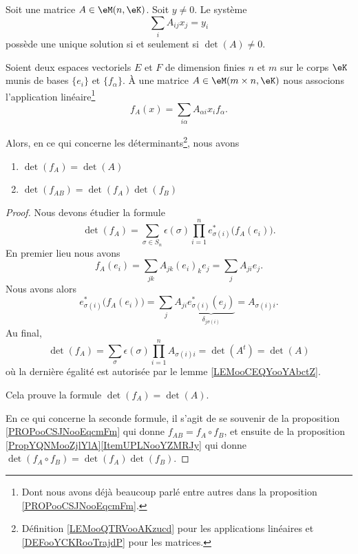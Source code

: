 \begin{proposition}	\label{PROPooNRZEooPxEqnO}
	Soit une matrice \( A\in \eM(n,\eK)\). Soit \( y\neq 0\). Le système
	\begin{equation}
		\sum_iA_{ij}x_j=y_i
	\end{equation}
	possède une unique solution si et seulement si \( \det(A)\neq 0\).
\end{proposition}


\begin{proposition}     \label{PROPooFKDXooKMSolt}
	Soient deux espaces vectoriels \( E\) et \( F\) de dimension finies \( n\) et \( m\) sur le corps \( \eK\) munis de bases \( \{e_i\}\) et \( \{f_{\alpha}\}\). À une matrice \( A\in \eM(m\times n,\eK)\) nous associons l'application linéaire\footnote{Dont nous avons déjà beaucoup parlé entre autres dans la proposition \ref{PROPooCSJNooEqcmFm}.}
	\begin{equation}
		f_A(x)=\sum_{i\alpha}A_{\alpha i}x_if_{\alpha}.
	\end{equation}

	Alors, en ce qui concerne les déterminants\footnote{Définition \ref{LEMooQTRVooAKzucd} pour les applications linéaires et \ref{DEFooYCKRooTrajdP} pour les matrices.}, nous avons
	\begin{enumerate}
		\item
		      \( \det(f_A)=\det(A)\)
		\item
		      \( \det(f_{AB})=\det(f_A)\det(f_B)\)
	\end{enumerate}
\end{proposition}

\begin{proof}
	Nous devons étudier la formule
	\begin{equation}
		\det(f_A)=\sum_{\sigma\in S_n}\epsilon(\sigma)\prod_{i=1}^ne_{\sigma(i)}^*\big( f_A(e_i) \big).
	\end{equation}
	En premier lieu nous avons
	\begin{equation}
		f_A(e_i)=\sum_{jk}A_{jk}(e_i)_ke_j=\sum_jA_{ji}e_j.
	\end{equation}
	Nous avons alors
	\begin{equation}
		e_{\sigma(i)}^*\big( f_A(e_i) \big)=\sum_jA_{ji}\underbrace{e^*_{\sigma(i)}(e_j)}_{\delta_{j\sigma(i)}}=A_{\sigma(i)i}.
	\end{equation}
	Au final,
	\begin{equation}
		\det(f_A)=\sum_{\sigma}\epsilon(\sigma)\prod_{i=1}^nA_{\sigma(i)i}=\det(A^t)=\det(A)
	\end{equation}
	où la dernière égalité est autorisée par le lemme \ref{LEMooCEQYooYAbctZ}.

	Cela prouve la formule \( \det(f_A)=\det(A)\).

	En ce qui concerne la seconde formule, il s'agit de se souvenir de la proposition \ref{PROPooCSJNooEqcmFm} qui donne \( f_{AB}=f_A\circ f_B\), et ensuite de la proposition \ref{PropYQNMooZjlYlA}\ref{ItemUPLNooYZMRJy} qui donne \( \det(f_A\circ f_B)=\det(f_A)\det(f_B)\).
\end{proof}


